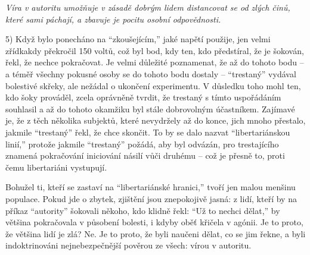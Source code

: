 \documentclass{book}
\begin{document}
\emph{Víra v autoritu umožňuje v zásadě dobrým lidem distancovat se od zlých činů, které sami páchají, a zbavuje je pocitu osobní odpovědnosti.}

5) Když bylo ponecháno na \enquote{zkoušejícím,} jaké napětí použije, jen velmi zřídkakdy překročil 150 voltů, což byl bod, kdy ten, kdo předstíral, že je šokován, řekl, že nechce pokračovat. Je velmi důležité poznamenat, že až do tohoto bodu -- a téměř všechny pokusné osoby se do tohoto bodu dostaly -- \enquote{trestaný} vydával bolestivé skřeky, ale nežádal o ukončení experimentu. V důsledku toho mohl ten, kdo šoky prováděl, zcela oprávněně tvrdit, že trestaný s tímto uspořádáním souhlasil a až do tohoto okamžiku byl stále dobrovolným účastníkem. Zajímavé je, že z těch několika subjektů, které nevydržely až do konce, jich mnoho přestalo, jakmile \enquote{trestaný} řekl, že chce skončit. To by se dalo nazvat \enquote{libertariánskou linií,} protože jakmile \enquote{trestaný} požádá, aby byl odvázán, pro trestajícího znamená pokračování iniciování násilí vůči druhému -- což je přesně to, proti čemu libertariáni vystupují.

Bohužel ti, kteří se zastaví na \enquote{libertariánské hranici,} tvoří jen malou menšinu populace. Pokud jde o zbytek, zjištění jsou znepokojivě jasná: z lidí, kteří by na příkaz \enquote{autority} šokovali někoho, kdo klidně řekl: \enquote{Už to nechci dělat,} by většina pokračovala v působení bolesti, i kdyby oběť křičela v agónii. Je to proto, že většina lidí je zlá? Ne. Je to proto, že byli naučeni dělat, co se jim řekne, a byli indoktrinováni nejnebezpečnější pověrou ze všech: vírou v autoritu.
\end{document}
